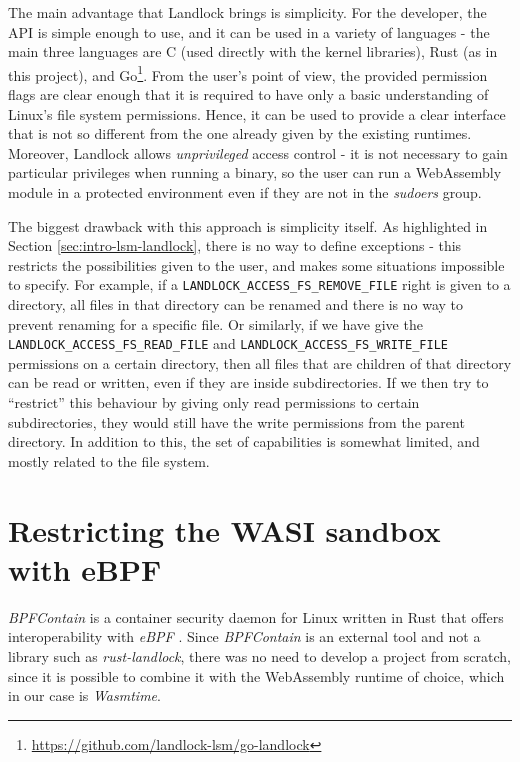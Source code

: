 The main advantage that Landlock brings is simplicity. For the developer, the API is simple enough to use,
and it can be used in a variety of languages - the main three languages are C (used directly with the kernel libraries),
Rust (as in this project), and Go\footnote{\url{https://github.com/landlock-lsm/go-landlock}}.
From the user's point of view, the provided permission flags are clear enough that it is required to have
only a basic understanding of Linux's file system permissions.
Hence, it can be used to provide a clear interface that is not so different from the one already given by
the existing runtimes.
Moreover, Landlock allows \textit{unprivileged} access control - it is not necessary to gain particular privileges
when running a binary, so the user can run a WebAssembly module in a protected environment even if they are not
in the \textit{sudoers} group.

The biggest drawback with this approach is simplicity itself. As highlighted in Section \ref{sec:intro-lsm-landlock},
there is no way to define exceptions - this restricts the possibilities given to the user, and makes some situations
impossible to specify. For example, if a \texttt{LANDLOCK\_ACCESS\_FS\_REMOVE\_FILE} right is given to a directory,
all files in that directory can be renamed and there is no way to prevent renaming for a specific file.
Or similarly, if we have give the \texttt{LANDLOCK\_ACCESS\_FS\_READ\_FILE} and \texttt{LANDLOCK\_ACCESS\_FS\_WRITE\_FILE}
permissions on a certain directory, then all files that are children of that directory can be read or written, even
if they are inside subdirectories. If we then try to ``restrict'' this behaviour by giving only read permissions to
certain subdirectories, they would still have the write permissions from the parent directory.
In addition to this, the set of capabilities is somewhat limited, and mostly related to the file system.

\section{Restricting the WASI sandbox with eBPF}

\textit{BPFContain} \cite{bpfcontain} is a container security daemon for Linux written in Rust that offers
interoperability with \textit{eBPF} \cite{ebpf}.
Since \textit{BPFContain} is an external tool and not a library such as \textit{rust-landlock}, there was no need
to develop a project from scratch, since it is possible to combine it with the WebAssembly runtime of choice, which
in our case is \textit{Wasmtime}.

